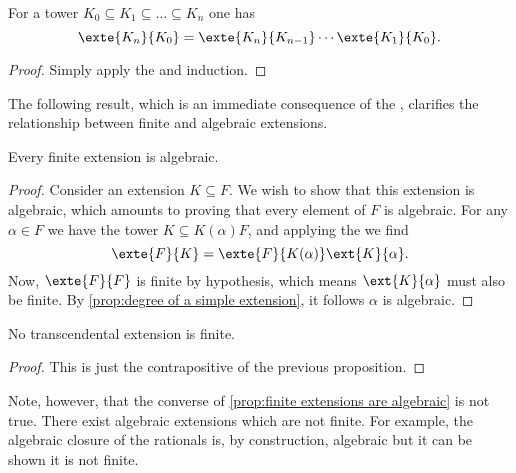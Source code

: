 \documentclass[12pt,oneside]{book}
\begin{document}
\begin{corollary}
	For a tower \( K_0 \subseteq K_1 \subseteq \dots \subseteq K_n \) one has
	\begin{equation*}
		\exte{K_n}{K_0} = \exte{K_n}{K_{n-1}} \cdots \exte{K_1}{K_0}.
	\end{equation*}
\end{corollary}
\begin{proof}
	Simply apply the  and induction.
\end{proof}

\parbreak

The following result, which is an immediate consequence of the , clarifies the relationship between finite and algebraic extensions.
\begin{proposition}\label{prop:finite extensions are algebraic}
	Every finite extension is algebraic.
\end{proposition}
\begin{proof}
	Consider an extension \( K \subseteq F \). We wish to show that this extension is
	algebraic, which amounts to proving that every element of \( F \) is algebraic. For any
	\( \alpha \in F \) we have the tower \( K \subseteq K(\alpha) F \), and applying the
	 we find
	\begin{equation*}
		\exte{F}{K} = \exte{F}{K(\alpha)} \ext{K}{\alpha}.
	\end{equation*}
	Now, \( \exte{F}{F} \) is finite by hypothesis, which means \( \ext{K}{\alpha} \) must
	also be finite. By \cref{prop:degree of a simple extension}, it follows \( \alpha \) is
	algebraic.
\end{proof}
\begin{corollary}
	No transcendental extension is finite.
\end{corollary}
\begin{proof}
	This is just the contrapositive of the previous proposition.
\end{proof}
Note, however, that the converse of \cref{prop:finite extensions are algebraic} is not
true. There exist algebraic extensions which are not finite. For example, the algebraic
closure of the rationals is, by construction, algebraic but it can be shown it is not
finite.
\end{document}
